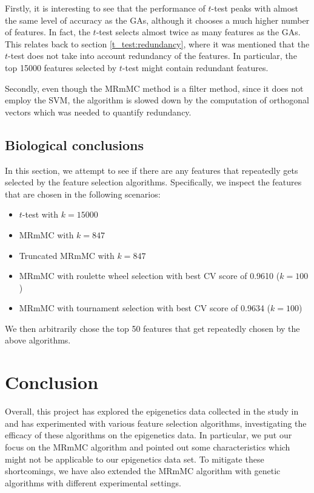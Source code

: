 \documentclass[12pt, twoside, a4paper]{report}
\begin{document}
Firstly, it is interesting to see that the performance of $t$-test peaks with almost the same level of accuracy as the GAs, although it chooses a much higher number of features. In fact, the $t$-test selects almost twice as many features as the GAs. This relates back to section \ref{t_test:redundancy}, where it was mentioned that the $t$-test does not take into account redundancy of the features. In particular, the top 15000 features selected by $t$-test might contain redundant features.

Secondly, even though the MRmMC method is a filter method, since it does not employ the SVM, the algorithm is slowed down by the computation of orthogonal vectors which was needed to quantify redundancy.

\section{Biological conclusions}

In this section, we attempt to see if there are any features that repeatedly gets selected by the feature selection algorithms. Specifically, we inspect the features that are chosen in the following scenarios:
\begin{itemize}
  \item $t$-test with $k=15000$
  \item MRmMC with $k=847$
  \item Truncated MRmMC with $k=847$
  \item MRmMC with roulette wheel selection with best CV score of 0.9610 ($k=100$)
  \item MRmMC with tournament selection with best CV score of 0.9634 ($k=100$)
\end{itemize}

We then arbitrarily chose the top 50 features that get repeatedly chosen by the above algorithms.



\chapter{Conclusion}

Overall, this project has explored the epigenetics data collected in the study in \cite{RefWorks:78} and has experimented with various feature selection algorithms, investigating the efficacy of these algorithms on the epigenetics data. In particular, we put our focus on the MRmMC algorithm and pointed out some characteristics which might not be applicable to our epigenetics data set. To mitigate these shortcomings, we have also extended the MRmMC algorithm with genetic algorithms with different experimental settings.
\end{document}
